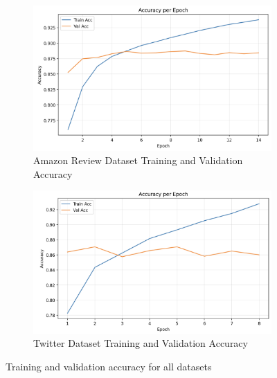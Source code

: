 \documentclass{article}
\begin{document}
\begin{figure}[htbp]
    \begin{subfigure}{0.45\textwidth}
        \centering
        \includegraphics[width=\linewidth]{amazon_acc.png}
        \caption{Amazon Review Dataset Training and Validation Accuracy}
        \label{fig:amazon_acc}
    \end{subfigure}
    \hfill
    \begin{subfigure}{0.45\textwidth}
        \centering
        \includegraphics[width=\linewidth]{twitter_acc.png}
        \caption{Twitter Dataset Training and Validation Accuracy}
        \label{fig:twitter_acc}
    \end{subfigure}
    \caption{Training and validation accuracy for all datasets}
    \label{fig:all_accuracies}
\end{figure}
\printbibliography
\end{document}

